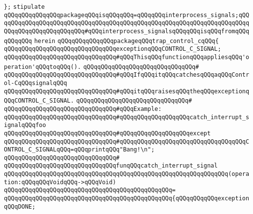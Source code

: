 \verb|};|\newline
\newline
\verb|stipulate|\newline
\verb|qQQqqQQqqQQqqQQqpackageqQQqisqQQqqQQq=qQQqqQQqinterprocess_signals;qQQqqQQqqQQqqQQqqQQqqQQqqQQqqQQqqQQqqQQqqQQqqQQqqQQqqQQqqQQqqQQqqQQqqQQqqQQqqQQqqQQqqQQqqQQqqQQq#qQQqinterprocess_signalsqQQqqQQqisqQQqfromqQQqqQQqqQQq|\newline
\verb|herein|\newline
\verb|qQQqqQQqqQQqqQQqpackageqQQqtrap_control_cqQQq{|\newline
\newline
\verb|qQQqqQQqqQQqqQQqqQQqqQQqqQQqqQQqexceptionqQQqCONTROL_C_SIGNAL;|\newline
\newline
\verb|qQQqqQQqqQQqqQQqqQQqqQQqqQQqqQQq#qQQqThisqQQqfunctionqQQqappliesqQQq'operation'qQQqtoqQQq().|\newline
\verb|qQQqqQQqqQQqqQQqqQQqqQQqqQQqqQQq#|\newline
\verb|qQQqqQQqqQQqqQQqqQQqqQQqqQQqqQQq#qQQqIfqQQqitqQQqcatchesqQQqaqQQqControl-CqQQqsignalqQQq|\newline
\verb|qQQqqQQqqQQqqQQqqQQqqQQqqQQqqQQq#qQQqitqQQqraisesqQQqtheqQQqexceptionqQQqCONTROL_C_SIGNAL.|\newline
\verb|qQQqqQQqqQQqqQQqqQQqqQQqqQQqqQQq#|\newline
\verb|qQQqqQQqqQQqqQQqqQQqqQQqqQQqqQQq#qQQqExample:|\newline
\verb|qQQqqQQqqQQqqQQqqQQqqQQqqQQqqQQq#qQQqqQQqqQQqqQQqqQQqcatch_interrupt_signalqQQqfoo|\newline
\verb|qQQqqQQqqQQqqQQqqQQqqQQqqQQqqQQq#qQQqqQQqqQQqqQQqqQQqexcept|\newline
\verb|qQQqqQQqqQQqqQQqqQQqqQQqqQQqqQQq#qQQqqQQqqQQqqQQqqQQqqQQqqQQqqQQqqQQqCONTROL_C_SIGNALqQQq=qQQqprintqQQq"Bang!\n";|\newline
\verb|qQQqqQQqqQQqqQQqqQQqqQQqqQQqqQQq#|\newline
\verb|qQQqqQQqqQQqqQQqqQQqqQQqqQQqqQQqfunqQQqcatch_interrupt_signal|\newline
\verb|qQQqqQQqqQQqqQQqqQQqqQQqqQQqqQQqqQQqqQQqqQQqqQQqqQQqqQQqqQQqqQQq(operation:qQQqqQQqVoidqQQq->qQQqVoid)|\newline
\verb|qQQqqQQqqQQqqQQqqQQqqQQqqQQqqQQqqQQqqQQqqQQqqQQq=|\newline
\verb|qQQqqQQqqQQqqQQqqQQqqQQqqQQqqQQqqQQqqQQqqQQqqQQq{qQQqqQQqqQQqexceptionqQQqDONE;|\newline
